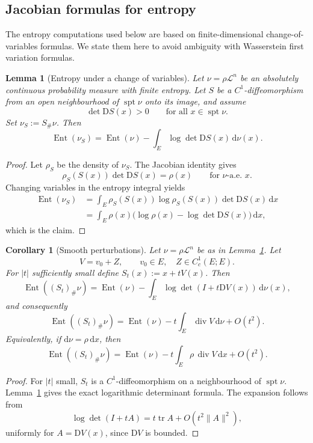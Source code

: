 \documentclass[10pt,a4paper]{amsart}
\numberwithin{equation}{section}
\newtheorem{lemma}[theorem]{Lemma}
\newtheorem{corollary}[theorem]{Corollary}
\newcommand{\Ent}{\operatorname{Ent}}
\newcommand{\supp}{\operatorname{spt}}
\newcommand{\dd}{\mathrm d}
\newcommand{\D}{\mathrm D}
\begin{document}
	
	
	\subsection{Jacobian formulas for entropy}\label{sec:entropy-jacobian}
	
	The entropy computations used below are based on finite-dimensional change-of-variables formulas. We state them here to avoid ambiguity with Wasserstein first variation formulas.
	
	\begin{lemma}[Entropy under a change of variables]
		\label{lem:entropy-change-of-variables}
		Let \(\nu=\rho\mathcal L^n\) be an absolutely continuous probability measure with finite entropy. Let \(S\) be a \(C^1\)-diffeomorphism from an open neighbourhood of \(\supp\nu\) onto its image, and assume
		\[
		\det \D S(x)>0
		\qquad\text{for all }x\in\supp\nu.
		\]
		Set \(\nu_S:=S_\#\nu\). Then
		\[
		\Ent(\nu_S)
		=\Ent(\nu)-\int_E \log\det\D S(x)\,\dd\nu(x).
		\]
	\end{lemma}
	
	\begin{proof}
		Let \(\rho_S\) be the density of \(\nu_S\). The Jacobian identity gives
		\[
		\rho_S(S(x))\det\D S(x)=\rho(x)
		\qquad\text{for }\nu\text{-a.e. }x.
		\]
		Changing variables in the entropy integral yields
		\[
		\begin{aligned}
			\Ent(\nu_S)
			&=\int_E \rho_S(S(x))\log\rho_S(S(x))\det\D S(x)\,\dd x \\
			&=\int_E \rho(x)\bigl(\log\rho(x)-\log\det\D S(x)\bigr)\,\dd x,
		\end{aligned}
		\]
		which is the claim.
	\end{proof}
	
	\begin{corollary}[Smooth perturbations]
		\label{cor:smooth-perturbation-entropy}
		Let \(\nu=\rho\mathcal L^n\) be as in Lemma~\ref{lem:entropy-change-of-variables}. Let
		\[
		V=v_0+Z,
		\qquad v_0\in E,\quad Z\in C_c^1(E;E).
		\]
		For \(|t|\) sufficiently small define \(S_t(x):=x+tV(x)\). Then
		\[
		\Ent((S_t)_\#\nu)
		=\Ent(\nu)-\int_E\log\det(I+t\D V(x))\,\dd\nu(x),
		\]
		and consequently
		\[
		\Ent((S_t)_\#\nu)
		=\Ent(\nu)-t\int_E \operatorname{div}V\,\dd\nu+O(t^2).
		\]
		Equivalently, if \(\dd\nu=\rho\,\dd x\), then
		\[
		\Ent((S_t)_\#\nu)
		=\Ent(\nu)-t\int_E \rho\,\operatorname{div}V\,\dd x+O(t^2).
		\]
	\end{corollary}
	
	\begin{proof}
		For \(|t|\) small, \(S_t\) is a \(C^1\)-diffeomorphism on a neighbourhood of \(\supp\nu\). Lemma~\ref{lem:entropy-change-of-variables} gives the exact logarithmic determinant formula. The expansion follows from
		\[
		\log\det(I+tA)=t\operatorname{tr}A+O(t^2\|A\|^2),
		\]
		uniformly for \(A=\D V(x)\), since \(\D V\) is bounded.
	\end{proof}
	
\end{document}
